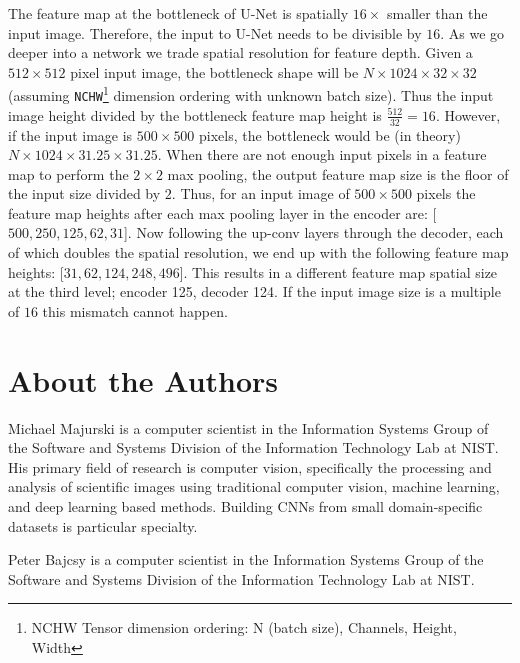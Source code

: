 \documentclass[twoside,11pt]{article}
\begin{document}
The feature map at the bottleneck of U-Net is spatially $16 \times$ smaller than the input image. Therefore, the input to U-Net needs to be divisible by $16$.
As we go deeper into a network we trade spatial resolution for feature depth. Given a $512 \times 512$ pixel input image, the bottleneck shape will be $N \times 1024 \times 32 \times 32$ (assuming \texttt{NCHW}\footnote{NCHW Tensor dimension ordering: N (batch size), Channels, Height, Width} dimension ordering with unknown batch size). Thus the input image height divided by the bottleneck feature map height is $\frac{512}{32} = 16$. However, if the input image is $500 \times 500$ pixels, the bottleneck would be (in theory) $N \times 1024 \times 31.25 \times 31.25$. When there are not enough input pixels in a feature map to perform the $2 \times 2$ max pooling, the output feature map size is the floor of the input size divided by $2$. 
Thus, for an input image of $500 \times 500$ pixels the feature map heights after each max pooling layer in the encoder are: [$500, 250, 125, 62, 31$]. Now following the up-conv layers through the decoder, each of which doubles the spatial resolution, we end up with the following feature map heights: [$31, 62, 124, 248, 496$]. This results in a different feature map spatial size at the third level; encoder 125, decoder 124. If the input image size is a multiple of $16$ this mismatch cannot happen. 




\section{About the Authors}

Michael Majurski is a computer scientist in the Information Systems Group of the Software and Systems Division of the Information Technology Lab at NIST. His primary field of research is computer vision, specifically the processing and analysis of scientific images using traditional computer vision, machine learning, and deep learning based methods. Building CNNs from small domain-specific datasets is particular specialty.

Peter Bajcsy  is a computer scientist in the Information Systems Group of the Software and Systems Division of the Information Technology Lab at NIST.

\clearpage
\end{document}
